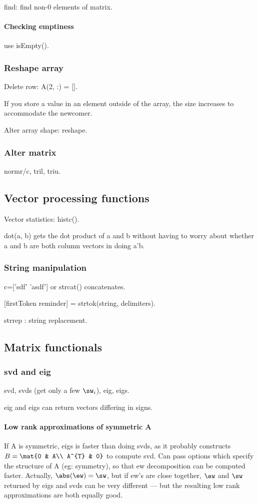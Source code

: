 find: find non-0 elements of matrix.

\paragraph*{Checking emptiness}
use isEmpty().

\subsubsection{Reshape array}
Delete row: A(2, :) = [].

If you store a value in an element outside of the array, the size increases to accommodate the newcomer.

Alter array shape: reshape.

\subsubsection{Alter matrix}
normr/c, tril, triu.

\subsection{Vector processing functions}
Vector statistics: histc().

dot(a, b) gets the dot product of a and b without having to worry about whether a and b are both column vectors in doing a'b.

\subsubsection{String manipulation}
c=['sdf' 'asdf'] or strcat() concatenates.

[firstToken reminder] = strtok(string, delimiters).

strrep : string replacement.

\subsection{Matrix functionals}
\subsubsection{svd and eig}
svd, svds (get only a few $\sw_i$), eig, eigs.

eig and eigs can return vectors differing in signs. \why

\paragraph*{Low rank approximations of symmetric A}
If A is symmetric, eigs is faster than doing svds, as it probably constructs $B = \mat{0 & A\\ A^{T} & 0}$ to compute svd. Can pass options which specify the structure of A (eg: symmetry), so that ew decomposition can be computed faster. Actually, $\abs(\ew) = \sw$, but if ew's are close together, $\ew$ and $\sw$ returned by eigs and svds can be very different --- but the resulting low rank approximations are both equally good.

